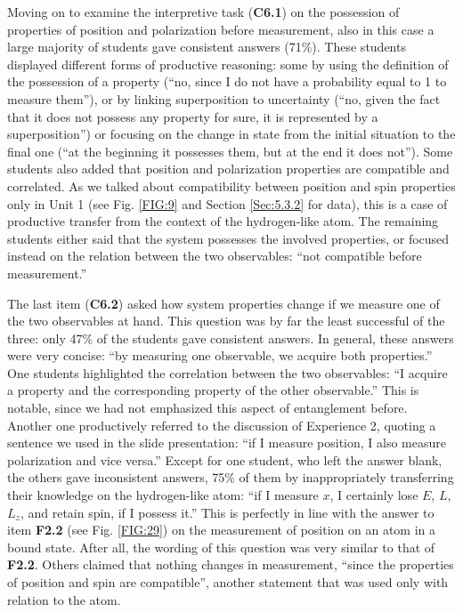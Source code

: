 \documentclass[twocolumn,secnumarabic,amssymb, nobibnotes, aps, prd, nofootinbib]{revtex4-2}
\begin{document}
Moving on to examine the interpretive task (\textbf{C6.1}) on the possession of properties of position and polarization before measurement, also in this case a large majority of students gave consistent answers (71\%). These students displayed different forms of productive reasoning: some by using the definition of the possession of a property (``no, since I do not have a probability equal to 1 to measure them''), or by linking superposition to uncertainty (``no, given the fact that it does not possess any property for sure, it is represented by a superposition'') or focusing on the change in state from the initial situation to the final one (``at the beginning it possesses them, but at the end it does not''). Some students also added that position and polarization properties are compatible and correlated. As we talked about compatibility between position and spin properties only in Unit 1 (see Fig. \ref{FIG:9} and Section \ref{Sec:5.3.2} for data), this is a case of productive transfer from the context of the hydrogen-like atom. The remaining students either said that the system possesses the involved properties, or focused instead on the relation between the two observables: ``not compatible before measurement.''

The last item (\textbf{C6.2}) asked how system properties change if we measure one of the two observables at hand. This question was by far the least successful of the three:  only 47\% of the students gave consistent answers. In general, these answers were very concise: ``by measuring one observable, we acquire both properties.'' One students highlighted the correlation between the two observables: ``I acquire a property and the corresponding property of the other observable.'' This is notable, since we had not emphasized this aspect of entanglement before. Another one productively referred to the discussion of Experience 2, quoting a sentence we used in the slide presentation: ``if I measure position, I also measure polarization and vice versa.'' Except for one student, who left the answer blank, the others gave inconsistent answers, 75\% of them by inappropriately transferring their knowledge on the hydrogen-like atom: ``if I measure $x$, I certainly lose $E$, $L$, $L_z$, and retain spin, if I possess it.'' This is perfectly in line with the answer to item \textbf{F2.2} (see Fig. \ref{FIG:29}) on the measurement of position on an atom in a bound state. After all, the wording of this question was very similar to that of \textbf{F2.2}.  Others claimed that nothing changes in measurement, ``since the properties of position and spin are compatible'', another statement that was used only with relation to the atom.
\end{document}
